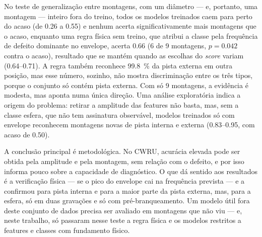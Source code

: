 No teste de generalização entre montagens, com um diâmetro --- e, portanto, uma
montagem --- inteiro fora do treino, todos os modelos treinados caem para perto
do acaso (de \num{0.26} a \num{0.55}) e nenhum acerta significativamente mais
montagens que o acaso, enquanto uma regra física sem treino, que atribui a
classe pela frequência de defeito dominante no envelope, acerta \num{0.66}
(6 de 9 montagens, $p = \num{0.042}$ contra o acaso), resultado que se mantém
quando as escolhas do \emph{score} variam (\numrange{0.64}{0.71}). A regra também
reconhece \SI{99.8}{\percent} da pista externa em outra posição, mas esse número,
sozinho, não mostra discriminação entre os três tipos, porque o conjunto só
contém pista externa. Com só 9 montagens, a
evidência é modesta, mas aponta numa única direção. Uma análise exploratória
indica a origem do problema: retirar a amplitude das features não basta, mas,
sem a classe esfera, que não tem assinatura observável, modelos treinados só
com envelope reconhecem montagens novas de pista interna e externa
(\numrange{0.83}{0.95}, com acaso de \num{0.50}).

A conclusão principal é metodológica. No CWRU, acurácia elevada pode ser obtida
pela amplitude e pela montagem, sem relação com o defeito, e por isso informa
pouco sobre a capacidade de diagnóstico. O que dá sentido aos
resultados é a verificação física --- se o pico do envelope cai na frequência
prevista --- e a confirmou para pista interna e para a maior parte da pista
externa, mas, para a esfera, só em duas gravações e só com pré-branqueamento. Um modelo útil fora deste conjunto de dados
precisa ser avaliado em montagens que não viu --- e, neste trabalho, só passaram
nesse teste a regra física e os modelos restritos a features e classes com
fundamento físico.
